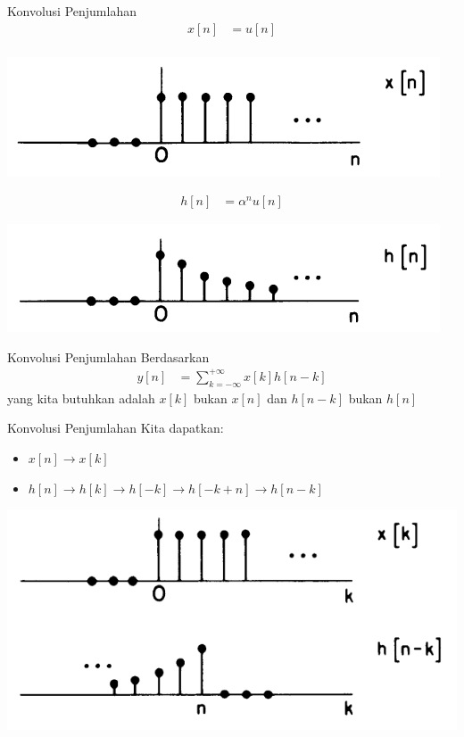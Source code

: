 \documentclass[pdflatex,compress,mathserif]{beamer}
\begin{document}
\begin{frame}{Konvolusi Penjumlahan}
	\begin{align*}
	x[n] &= u[n] \\
	\end{align*}
	\begin{center}
		\includegraphics[width=0.5\linewidth]{img/img09}
	\end{center}
	\begin{align*}
		h[n] &= \alpha^n u[n]
	\end{align*}
	\begin{center}
		\includegraphics[width=0.5\linewidth]{img/img10}
	\end{center}
\end{frame}

\begin{frame}{Konvolusi Penjumlahan}
	Berdasarkan
	\begin{align*}
		y[n] &= \sum_{k=-\infty}^{+\infty} x[k] h[n-k]
	\end{align*}
	yang kita butuhkan adalah $ x[k] $ bukan $ x[n] $ dan $ h[n-k] $ bukan $ h[n] $
\end{frame}

\begin{frame}{Konvolusi Penjumlahan}
	Kita dapatkan:\\
	\begin{itemize}
		\item $ x[n] \rightarrow x[k] $
		\item $ h[n] \rightarrow h[k] \rightarrow h[-k] \rightarrow h[-k+n] \rightarrow h[n-k]$
	\end{itemize}

	\begin{center}
		\includegraphics[width=0.8\linewidth]{img/img11}
	\end{center}
	
\end{frame}
\end{document}
